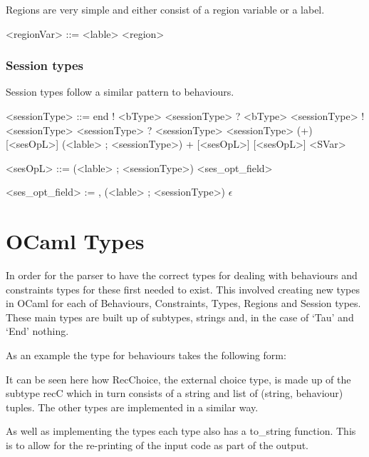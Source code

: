 Regions are very simple and either consist of a region variable or a label. 

\begin{grammar}

<regionVar> ::= <lable>
\alt <region>

\end{grammar}

\subsubsection{Session types}

Session types follow a similar pattern to behaviours.

\begin{grammar}

<sessionType> ::= end
\alt ! <bType> <sessionType>
\alt ? <bType> <sessionType>
\alt ! <sessionType> <sessionType>
\alt ? <sessionType> <sessionType>
\alt (+) [<sesOpL>] (<lable> ; <sessionType>)
\alt + [<sesOpL>] [<sesOpL>]
\alt <SVar>

<sesOpL> ::= (<lable> ; <sessionType>) <ses_opt_field>

<ses_opt_field> := , (<lable> ; <sessionType>)
\alt $\epsilon$

\end{grammar}

\section{OCaml Types}

In order for the parser to have the correct types for dealing with behaviours and constraints types for these first needed to exist. This involved creating new types in OCaml for each of Behaviours, Constraints, Types, Regions and Session types. These main types are built up of subtypes, strings and, in the case of `Tau' and `End' nothing. 

As an example the type for behaviours takes the following form: 



It can be seen here how RecChoice, the external choice type, is made up of the subtype recC which in turn consists of a string and list of (string, behaviour) tuples. The other types are implemented in a similar way. 

As well as implementing the types each type also has a to_string function. This is to allow for the re-printing of the input code as part of the output. 

